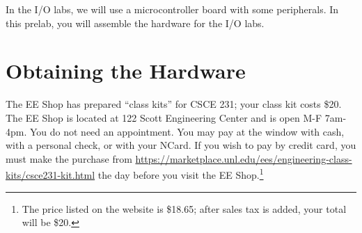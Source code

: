 

\usepackage{enumitem}
\usepackage{graphicx}
\usepackage{addfont}
\usepackage[normalem]{ulem}
\usepackage{subfig}
\usepackage{wrapfig}
\usepackage{animate}
\usepackage{multicol}

\renewcommand{\labnumber}{10-prelab}
\renewcommand{\labname}{Physical Assembly of Hardware for I/O Labs}
\renewcommand{\shortlabname}{i/o-prelab}
\renewcommand{\collaborationrules}{\freecollaboration}
\renewcommand{\duedate}{Before the start of your lab section on April 5 or 6}

\newcommand{\nano}{Arduino Nano}
\newcommand{\power}{{power~(\color{red}\bf+}) rail}
\newcommand{\ground}{ground~({\color{RoyalBlue}\bf--}) rail}
\newcommand{\checkpoint}[1]{\stepcounter{checkpoint}\vspace{1cm}
\textbf{\textsc{CheckPoint}~\thecheckpoint:} Before proceeding further, have a
TA or a classmate verify that you have correctly #1. Update
\textit{checkpoints.txt} file to indicate who checked your work and when they
did so.\vspace{1cm}}
\newcommand{\disconnect}{\textbf{Before proceeding further, disconnect the USB
cable from the \nano.}}
\newcommand{\rainbow}{male-to-male rainbow cable}

\startdocument


In the I/O labs, we will use a microcontroller board with some peripherals. In
this prelab, you will assemble the hardware for the I/O labs.

\section{Obtaining the Hardware}

The EE Shop has prepared ``class kits'' for CSCE 231; your class kit costs \$20.
The EE Shop is located at 122 Scott Engineering Center and is open M-F 7am-4pm.
You do not need an appointment. You may pay at the window with cash, with a
personal check, or with your NCard. If you wish to pay by credit card, you must
make the purchase from
\url{https://marketplace.unl.edu/ees/engineering-class-kits/csce231-kit.html}
the day before you visit the EE Shop.\footnote{The price listed on the website
is \$18.65; after sales tax is added, your total will be \$20.}


